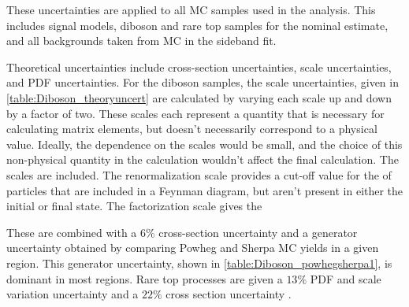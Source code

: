 These uncertainties are applied to all \ac{MC} samples used in the analysis. This includes signal models, diboson and rare top samples for the nominal estimate, and all backgrounds taken from \ac{MC} in the sideband fit. 

Theoretical uncertainties include cross-section uncertainties, scale uncertainties, and \ac{PDF} uncertainties. For the diboson samples, the scale uncertainties, given in \autoref{table:Diboson_theoryuncert} are calculated by varying each scale up and down by a factor of two. These scales each represent a quantity that is necessary for calculating matrix elements, but doesn't necessarily correspond to a physical value. Ideally, the dependence on the scales would be small, and the choice of this non-physical quantity in the calculation wouldn't affect the final calculation. The scales are included. The renormalization scale  provides a cut-off value for the \pt of particles that are included in a Feynman diagram, but aren't present in either the initial or final state. The factorization scale gives the 

 These are combined with a 6\% cross-section uncertainty and a generator uncertainty obtained by comparing {\sc Powheg} and {\sc Sherpa} \ac{MC} yields in a given region. This generator uncertainty, shown in \autoref{table:Diboson_powhegsherpa1}, is dominant in most regions. Rare top processes are given a $13\%$ PDF and scale variation uncertainty \cite{Alwall:2014hca} and a $22\%$ cross section uncertainty \cite{Campbell:2012,Lazopoulos:2008,Garzelli:2012bn}. 

